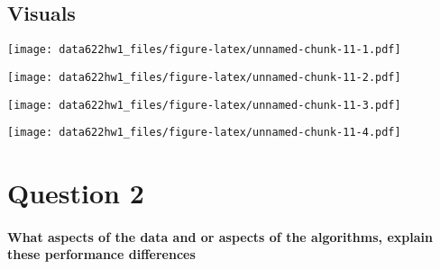 \documentclass[
]{article}
\newenvironment{Shaded}{\begin{snugshade}}{\end{snugshade}}
\newcommand{\NormalTok}[1]{#1}
\newcommand{\OperatorTok}[1]{\textcolor[rgb]{0.81,0.36,0.00}{\textbf{#1}}}
\begin{document}
\hypertarget{visuals}{%
\subsection{Visuals}\label{visuals}}

\begin{Shaded}
\end{Shaded}

\texttt{[image: data622hw1\_files/figure-latex/unnamed-chunk-11-1.pdf]}

\begin{Shaded}
\end{Shaded}

\texttt{[image: data622hw1\_files/figure-latex/unnamed-chunk-11-2.pdf]}

\begin{Shaded}
\end{Shaded}

\texttt{[image: data622hw1\_files/figure-latex/unnamed-chunk-11-3.pdf]}

\begin{Shaded}
\end{Shaded}

\texttt{[image: data622hw1\_files/figure-latex/unnamed-chunk-11-4.pdf]}

\hypertarget{question-2}{%
\section{Question 2}\label{question-2}}

\hypertarget{what-aspects-of-the-data-and-or-aspects-of-the-algorithms-explain-these-performance-differences}{%
\paragraph{What aspects of the data and or aspects of the algorithms,
explain these performance
differences}\label{what-aspects-of-the-data-and-or-aspects-of-the-algorithms-explain-these-performance-differences}}
\end{document}
